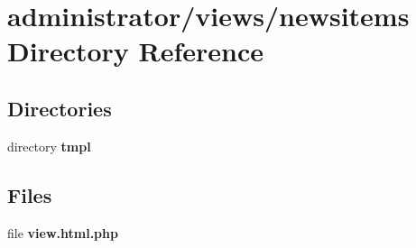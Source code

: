 \section{administrator/views/newsitems Directory Reference}
\label{dir_196a58c67c80f348084ae72c0b4c5f27}
\subsection*{Directories}
\begin{DoxyCompactItemize}
\item 
directory \textbf{ tmpl}
\end{DoxyCompactItemize}
\subsection*{Files}
\begin{DoxyCompactItemize}
\item 
file \textbf{ view.\+html.\+php}
\end{DoxyCompactItemize}
